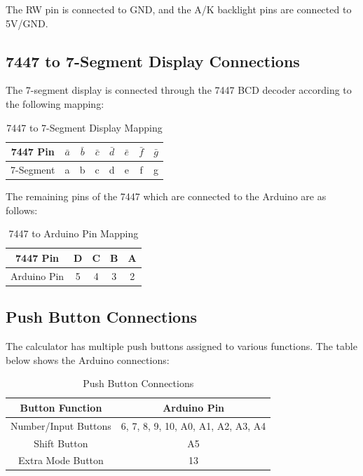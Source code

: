 \documentclass{article}
\begin{document}
The RW pin is connected to GND, and the A/K backlight pins are connected to 5V/GND.

\subsection{7447 to 7-Segment Display Connections}
The 7-segment display is connected through the 7447 BCD decoder according to the following mapping:

\begin{table}[h]
    \centering
    \begin{tabular}{|c|c|c|c|c|c|c|c|}
        \hline
        7447 Pin & $\bar{a}$ & $\bar{b}$ & $\bar{c}$ & $\bar{d}$ & $\bar{e}$ & $\bar{f}$ & $\bar{g}$ \\ \hline
        7-Segment & a & b & c & d & e & f & g \\ \hline
    \end{tabular}
    \caption{7447 to 7-Segment Display Mapping}
\end{table}

The remaining pins of the 7447 which are connected to the Arduino are as follows:

\begin{table}[h]
    \centering
    \begin{tabular}{|c|c|c|c|c|}
        \hline
        7447 Pin & D & C & B & A \\ \hline
        Arduino Pin & 5 & 4 & 3 & 2 \\ \hline
    \end{tabular}
    \caption{7447 to Arduino Pin Mapping}
\end{table}

\subsection{Push Button Connections}
The calculator has multiple push buttons assigned to various functions. The table below shows the Arduino connections:

\begin{table}[h]
    \centering
    \begin{tabular}{|c|c|}
        \hline
        Button Function & Arduino Pin \\ \hline
        Number/Input Buttons & 6, 7, 8, 9, 10, A0, A1, A2, A3, A4 \\ \hline
        Shift Button & A5 \\ \hline
        Extra Mode Button & 13 \\ \hline
    \end{tabular}
    \caption{Push Button Connections}
\end{table}
\end{document}
